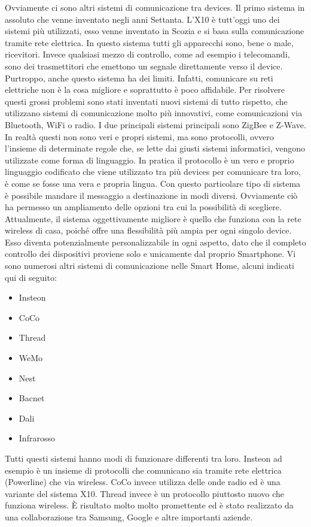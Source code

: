 Ovviamente ci sono altri sistemi di comunicazione tra devices. Il primo sistema in assoluto che venne inventato negli anni Settanta. L’X10 è tutt’oggi uno dei sistemi più utilizzati, esso venne inventato in Scozia e si basa sulla comunicazione tramite rete elettrica. In questo sistema tutti gli apparecchi sono, bene o male, ricevitori. Invece qualsiasi mezzo di controllo, come ad esempio i telecomandi, sono dei trasmettitori che emettono un segnale direttamente verso il device. 
Purtroppo, anche questo sistema ha dei limiti. Infatti, comunicare su reti elettriche non è la cosa migliore e soprattutto è poco affidabile. Per risolvere questi grossi problemi sono stati inventati nuovi sistemi di tutto rispetto, che utilizzano sistemi di comunicazione molto più innovativi, come comunicazioni via Bluetooth, WiFi o radio. I due principali sistemi principali sono ZigBee e Z-Wave. In realtà questi non sono veri e propri sistemi, ma sono protocolli, ovvero l’insieme di determinate regole che, se lette dai giusti sistemi informatici, vengono utilizzate come forma di linguaggio.
In pratica il protocollo è un vero e proprio linguaggio codificato che viene utilizzato tra più devices per comunicare tra loro, è come se fosse una vera e propria lingua. 
Con questo particolare tipo di sistema è possibile mandare il messaggio a destinazione in modi diversi. Ovviamente ciò ha permesso un ampliamento delle opzioni tra cui la possibilità di scegliere. 
Attualmente, il sistema oggettivamente migliore è quello che funziona con la rete wireless di casa, poiché offre una flessibilità più ampia per ogni singolo device. Esso diventa potenzialmente personalizzabile in ogni aspetto, dato che il completo controllo dei dispositivi proviene solo e unicamente dal proprio Smartphone. 
Vi sono numerosi altri sistemi  di comunicazione nelle Smart Home, alcuni indicati qui di seguito:
\begin{itemize}
    \item{Insteon}
    \item{CoCo}
    \item{Thread}
    \item{WeMo}
    \item{Nest}
    \item{Bacnet}
    \item{Dali}
    \item{Infrarosso}
\end{itemize}
Tutti questi sistemi hanno modi di funzionare differenti tra loro. Insteon ad esempio è un insieme di protocolli che comunicano sia tramite rete elettrica (Powerline) che via wireless. CoCo invece utilizza delle onde radio ed è una variante del sistema X10. Thread invece è un protocollo piuttosto nuovo che funziona wireless. È risultato molto molto promettente ed è stato realizzato da una collaborazione tra Samsung, Google e altre importanti aziende.
